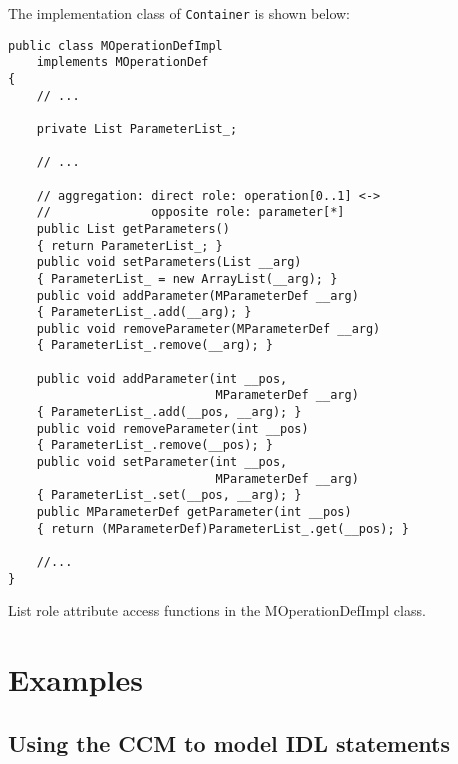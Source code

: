 The implementation class of {\tt Container} is shown below:

\begin{Example}
\begin{minifbox}
\begin{verbatim}
public class MOperationDefImpl
    implements MOperationDef
{
    // ...

    private List ParameterList_;

    // ...

    // aggregation: direct role: operation[0..1] <->
    //              opposite role: parameter[*]
    public List getParameters()
    { return ParameterList_; }
    public void setParameters(List __arg)
    { ParameterList_ = new ArrayList(__arg); }
    public void addParameter(MParameterDef __arg)
    { ParameterList_.add(__arg); }
    public void removeParameter(MParameterDef __arg)
    { ParameterList_.remove(__arg); }

    public void addParameter(int __pos,
                             MParameterDef __arg)
    { ParameterList_.add(__pos, __arg); }
    public void removeParameter(int __pos)
    { ParameterList_.remove(__pos); }
    public void setParameter(int __pos,
                             MParameterDef __arg)
    { ParameterList_.set(__pos, __arg); }
    public MParameterDef getParameter(int __pos)
    { return (MParameterDef)ParameterList_.get(__pos); }

    //...
}
\end{verbatim}
\end{minifbox}
\caption{List role attribute access functions in the MOperationDefImpl class.}
\label{example:metamodel-list-attribute-impl}
\end{Example}

\section{Examples}

\subsection{Using the CCM to model IDL statements}

